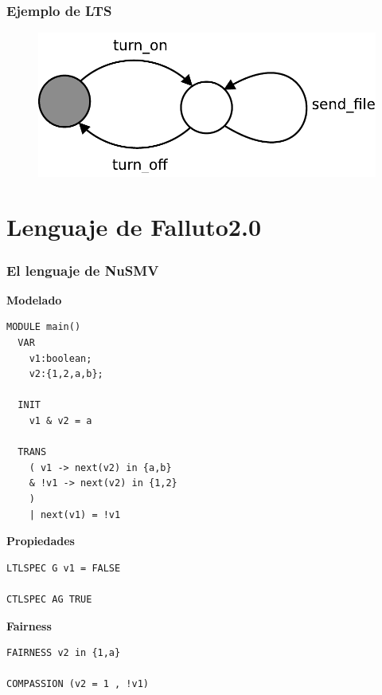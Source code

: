 \documentclass[serif]{beamer}
\begin{document}
\begin{frame}
\frametitle{Ejemplo de LTS}
\begin{figure}
  \centering
    \includegraphics[scale=0.65]{imagenes/lts.pdf}
\end{figure}
\end{frame}




\section[Lenguaje]{Lenguaje de Falluto2.0}


\begin{frame}[fragile]
\frametitle{El lenguaje de NuSMV}

{\fontsize{8pt}{10pt}\selectfont
\begin{minipage}{0.5\textwidth}
{\large \bfseries Modelado}
\begin{framed} \begin{verbatim}
MODULE main()
  VAR
    v1:boolean;
    v2:{1,2,a,b};

  INIT
    v1 & v2 = a

  TRANS
    ( v1 -> next(v2) in {a,b}
    & !v1 -> next(v2) in {1,2}
    ) 
    | next(v1) = !v1
\end{verbatim}
\end{framed}
\end{minipage}
\hspace{0.04\textwidth}
\begin{minipage}{0.44\textwidth}
{\large \bfseries Propiedades}
\begin{framed}
\begin{verbatim}
LTLSPEC G v1 = FALSE

CTLSPEC AG TRUE
\end{verbatim}
\end{framed}
{\large \bfseries Fairness}
\begin{framed}
\begin{verbatim}
FAIRNESS v2 in {1,a}

COMPASSION (v2 = 1 , !v1)
\end{verbatim}
\end{framed}
\end{minipage}
} %
\end{frame}
\end{document}
